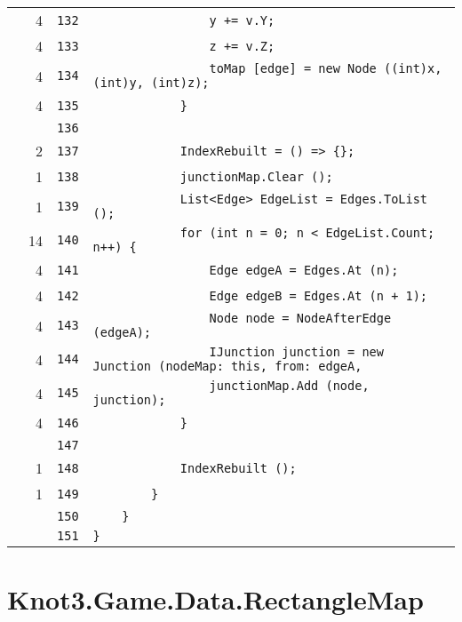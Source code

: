 \documentclass[a4paper,10pt]{article}
\begin{document}
\begin{longtable}[l]{lrrl}
\cellcolor{green} & 4 & \verb~132~ & \verb~                y += v.Y;~\\
\cellcolor{green} & 4 & \verb~133~ & \verb~                z += v.Z;~\\
\cellcolor{green} & 4 & \verb~134~ & \verb~                toMap [edge] = new Node ((int)x, (int)y, (int)z);~\\
\cellcolor{green} & 4 & \verb~135~ & \verb~            }~\\
\cellcolor{gray} &  & \verb~136~ & \verb~~\\
\cellcolor{green} & 2 & \verb~137~ & \verb~            IndexRebuilt = () => {};~\\
\cellcolor{green} & 1 & \verb~138~ & \verb~            junctionMap.Clear ();~\\
\cellcolor{green} & 1 & \verb~139~ & \verb~            List<Edge> EdgeList = Edges.ToList ();~\\
\cellcolor{green} & 14 & \verb~140~ & \verb~            for (int n = 0; n < EdgeList.Count; n++) {~\\
\cellcolor{green} & 4 & \verb~141~ & \verb~                Edge edgeA = Edges.At (n);~\\
\cellcolor{green} & 4 & \verb~142~ & \verb~                Edge edgeB = Edges.At (n + 1);~\\
\cellcolor{green} & 4 & \verb~143~ & \verb~                Node node = NodeAfterEdge (edgeA);~\\
\cellcolor{green} & 4 & \verb~144~ & \verb~                IJunction junction = new Junction (nodeMap: this, from: edgeA,~\\
\cellcolor{green} & 4 & \verb~145~ & \verb~                junctionMap.Add (node, junction);~\\
\cellcolor{green} & 4 & \verb~146~ & \verb~            }~\\
\cellcolor{gray} &  & \verb~147~ & \verb~~\\
\cellcolor{green} & 1 & \verb~148~ & \verb~            IndexRebuilt ();~\\
\cellcolor{green} & 1 & \verb~149~ & \verb~        }~\\
\cellcolor{gray} &  & \verb~150~ & \verb~    }~\\
\cellcolor{gray} &  & \verb~151~ & \verb~}~\\
\end{longtable}
\newpage
\section{Knot3.Game.Data.RectangleMap}
\end{document}
